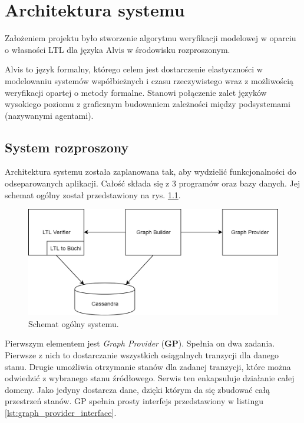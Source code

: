 \chapter{Architektura systemu}

Założeniem projektu było stworzenie algorytmu weryfikacji modelowej w oparciu o własności LTL dla języka Alvis w środowisku rozproszonym.

Alvis to język formalny, którego celem jest dostarczenie elastyczności w modelowaniu systemów współbieżnych i czasu rzeczywistego wraz z możliwością weryfikacji opartej o metody formalne.
Stanowi połączenie zalet języków wysokiego poziomu z graficznym budowaniem zależności między podsystemami (nazywanymi agentami).


\section{System rozproszony}

Architektura systemu została zaplanowana tak, aby wydzielić funkcjonalności do odseparowanych aplikacji.
Całość składa się z 3 programów oraz bazy danych.
Jej schemat ogólny został przedstawiony na rys. \ref{fig:system_overview}.

\begin{figure}[h]
    \centering
    \includegraphics[width=\linewidth,keepaspectratio]{img/system_overview.png}
    \caption{Schemat ogólny systemu.}
    \label{fig:system_overview}
\end{figure}

Pierwszym elementem jest \textit{Graph Provider} (\textbf{GP}).
Spełnia on dwa zadania.
Pierwsze z nich to dostarczanie wszystkich osiągalnych tranzycji dla danego stanu.
Drugie umożliwia otrzymanie stanów dla zadanej tranzycji, które można odwiedzić z wybranego stanu źródłowego.
Serwis ten enkapsuluje działanie całej domeny.
Jako jedyny dostarcza dane, dzięki którym da się zbudować całą przestrzeń stanów.
GP spełnia prosty interfejs przedstawiony w listingu \ref{lst:graph_provider_interface}.

